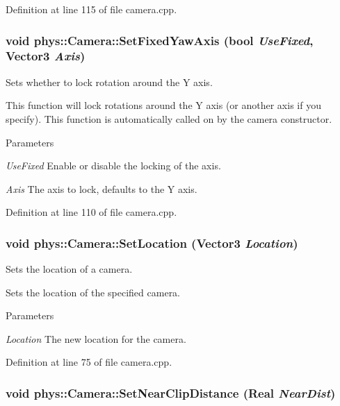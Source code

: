 Definition at line 115 of file camera.cpp.

\hypertarget{classphys_1_1Camera_a0fe097fbabbe1a88881f25bc827cabf5}{
\subsubsection[{SetFixedYawAxis}]{\setlength{\rightskip}{0pt plus 5cm}void phys::Camera::SetFixedYawAxis (bool {\em UseFixed}, \/  {\bf Vector3} {\em Axis})}}
\label{d9/df8/classphys_1_1Camera_a0fe097fbabbe1a88881f25bc827cabf5}


Sets whether to lock rotation around the Y axis. 

This function will lock rotations around the Y axis (or another axis if you specify). This function is automatically called on by the camera constructor. 
\begin{DoxyParams}{Parameters}
\item[{\em UseFixed}]Enable or disable the locking of the axis. \item[{\em Axis}]The axis to lock, defaults to the Y axis. \end{DoxyParams}


Definition at line 110 of file camera.cpp.

\hypertarget{classphys_1_1Camera_ab1fb572982464212b2fa33e2df6f688b}{
\subsubsection[{SetLocation}]{\setlength{\rightskip}{0pt plus 5cm}void phys::Camera::SetLocation ({\bf Vector3} {\em Location})}}
\label{d9/df8/classphys_1_1Camera_ab1fb572982464212b2fa33e2df6f688b}


Sets the location of a camera. 

Sets the location of the specified camera. 
\begin{DoxyParams}{Parameters}
\item[{\em Location}]The new location for the camera. \end{DoxyParams}


Definition at line 75 of file camera.cpp.

\hypertarget{classphys_1_1Camera_aff7cb792640b250cafdfbc333de4bbeb}{
\subsubsection[{SetNearClipDistance}]{\setlength{\rightskip}{0pt plus 5cm}void phys::Camera::SetNearClipDistance ({\bf Real} {\em NearDist})}}
\label{d9/df8/classphys_1_1Camera_aff7cb792640b250cafdfbc333de4bbeb}


